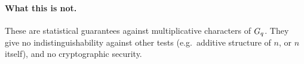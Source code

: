 \paragraph{What this is not.}
These are statistical guarantees against multiplicative characters of $G_q$. They give no
indistinguishability against other tests (e.g.\ additive structure of $n$, or $n$ itself), and no
cryptographic security.
